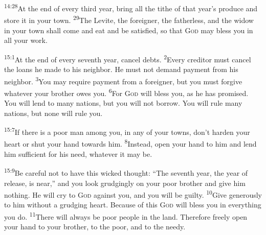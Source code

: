 \documentclass[openany,12pt,english]{book}
\newenvironment{para}{\par\pretolerance=100\tolerance=200\setlength{\emergencystretch}{0.6em}\relax}{\par}
\begin{document}
\begin{para}
    \textsuperscript{14:28}\thinspace{}At the end of eve\-ry third year, bring all the tithe of that year's pro\-duce and store it in your town.
    \textsuperscript{29}\thinspace{}The Levite, the for\-eign\-er, the fa\-ther\-less, and the wid\-ow in your town shall come and eat and be sat\-is\-fied, so that \textsc{God} may bless you in all your work.
\end{para}

\bigskip{}

\begin{para}
    \textsuperscript{15:1}\thinspace{}At the end of eve\-ry sev\-enth year, can\-cel debts.
    \textsuperscript{2}\thinspace{}Eve\-ry cred\-i\-tor must can\-cel the loans he made to his neigh\-bor. He must not de\-mand pay\-ment from his neigh\-bor.
    \textsuperscript{3}\thinspace{}You may re\-quire pay\-ment from a for\-eign\-er, but you must for\-give what\-ev\-er your broth\-er owes you.
    \textsuperscript{6}\thinspace{}For \textsc{God} will bless you, as he has prom\-ised. You will lend to man\-y nations, but you will not bor\-row. You will rule man\-y nations, but none will rule you.
\end{para}

\begin{para}
    \textsuperscript{15:7}\thinspace{}If there is a poor man a\-mong you, in any of your towns, don't hard\-en your heart or shut your hand to\-wards him.
    \textsuperscript{8}\thinspace{}In\-stead, o\-pen your hand to him and lend him suf\-fi\-cient for his need, what\-ev\-er it may be.
\end{para}

\begin{para}
    \textsuperscript{15:9}\thinspace{}Be care\-ful not to have this wick\-ed thought: “The sev\-enth year, the year of re\-lease, is near,” and you look grudg\-ing\-ly on your poor broth\-er and give him noth\-ing. He will cry to \textsc{God} a\-gainst you, and you will be guilt\-y.
    \textsuperscript{10}\thinspace{}Give gen\-er\-ous\-ly to him with\-out a grudg\-ing heart. Be\-cause of this \textsc{God} will bless you in eve\-ry\-thing you do.
    \textsuperscript{11}\thinspace{}There will al\-ways be poor peo\-ple in the land. There\-fore free\-ly o\-pen your hand to your broth\-er, to the poor, and to the needy.
\end{para}
\end{document}

